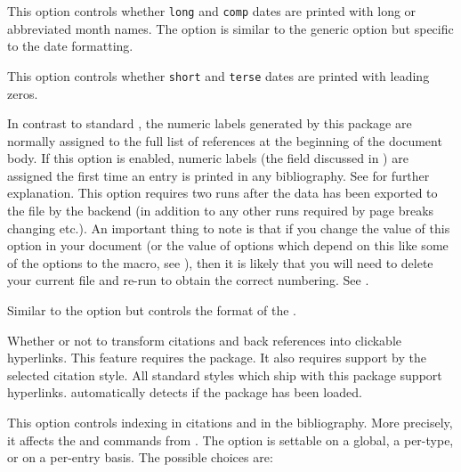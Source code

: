 \documentclass{ltxdockit}[2011/03/25]
\begin{document}
\begin{optionlist}

This option controls whether \texttt{long} and \texttt{comp} dates are printed with long or abbreviated month names. The option is similar to the generic  option but specific to the date formatting.


This option controls whether \texttt{short} and \texttt{terse} dates are printed with leading zeros.


In contrast to standard \latex, the numeric labels generated by this package are normally assigned to the full list of references at the beginning of the document body. If this option is enabled, numeric labels (\ie the  field discussed in ) are assigned the first time an entry is printed in any bibliography. See  for further explanation.  This option requires two \latex runs after the data has been exported to the  file by the backend (in addition to any other runs required by page breaks changing etc.). An important thing to note is that if you change the value of this option in your document (or the value of options which depend on this like some of the options to the  macro, see ), then it is likely that you will need to delete your current  file and re-run \latex to obtain the correct numbering. See .


Similar to the  option but controls the format of the .


Whether or not to transform citations and back references into clickable hyperlinks. This feature requires the  package. It also requires support by the selected citation style. All standard styles which ship with this package support hyperlinks.  automatically detects if the  package has been loaded.


This option controls indexing in citations and in the bibliography. More precisely, it affects the  and  commands from . The option is settable on a global, a per-type, or on a per-entry basis. The possible choices are:


\end{optionlist}
\end{document}
